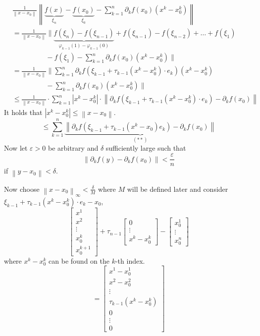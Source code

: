 \documentclass[a4paper,landscape,twocolumn]{article}
\theoremstyle{definition}
\newcommand\abs[1]{\left|#1\right|}
\newcommand\norm[1]{\left\|#1\right\|}
\newcommand\inorm[1]{\left\|#1\right\|_\infty}
\begin{document}
\begin{align*}
  &\frac1{\norm{x - x_0}} \norm{\underbrace{f(x)}_{\xi_n} - \underbrace{f(x_0)}_{\xi_0} - \sum_{k=1}^n \partial_k f(x_0) (x^k - x_0^k)} \\
  &=\frac{1}{\norm{x - x_0}} \| \underbrace{f(\xi_n) - f(\xi_{n-1})}_{\varphi_{k-1}(1) - \varphi_{k-1}(0)} + f(\xi_{n-1}) - f(\xi_{n-2}) + \ldots + f(\xi_1) \\
  &\hspace{58pt}- f(\xi_1) - \sum_{k=1}^n \partial_k f(x_0) (x^k - x_0^k)\| \\
  &= \frac{1}{\norm{x - x_0}} \| \sum_{k=1}^n \partial_k f(\xi_{k-1} + \tau_{k-1} (x^k - x_0^k) \cdot e_k) (x^k - x_0^k) \\
  &\hspace{58pt}- \sum_{k=1}^n \partial_k f(x_0) (x^k - x_0^k) \| \\
  &\leq \frac{1}{\norm{x - x_0}} \cdot \sum_{k=1}^n \abs{x^k - x_0^k} \cdot \norm{\partial_k f(\xi_{k-1} + \tau_{k-1}(x^k - x_0^k) \cdot e_k) - \partial_k f(x_0)}
\end{align*}
It holds that $\abs{x^k - x_0^k} \leq \norm{x - x_0}$.
\[ \leq \sum_{k=1}^n \underbrace{\norm{\partial_k f(\xi_{k-1} + \tau_{k-1}(x^k - x_0) e_k) - \partial_k f(x_0)}}_{(**)} \]
Now let $\varepsilon > 0$ be arbitrary and $\delta$ sufficiently large such that
\[ \norm{\partial_k f(y) - \partial_k f(x_0)} < \frac{\varepsilon}{n} \]
if $\norm{y - x_0} < \delta$.

Now choose $\inorm{x - x_0} < \frac{\delta}{M}$ where $M$ will be defined later
and consider $\xi_{k-1} + \tau_{k-1} (x^k - x_0^k) \cdot e_k - x_0$,
\[
\begin{bmatrix} x^1 \\ x^2 \\ \vdots \\ x_0^k \\ x_0^{k+1} \end{bmatrix}
+ \tau_{n-1} \begin{bmatrix} 0 \\ \vdots \\ x^k - x_0^k \end{bmatrix}
- \begin{bmatrix} x_0^1 \\ \vdots \\ x_0^n \end{bmatrix}
\]
where $x^k - x_0^k$ can be found on the $k$-th index.
\[ = \begin{bmatrix} x^1 - x_0^1 \\ x^2 - x_0^2 \\ \vdots \\ \tau_{k-1}(x^k - x_0^k) \\ 0 \\ \vdots \\ 0 \end{bmatrix} \]
\end{document}
